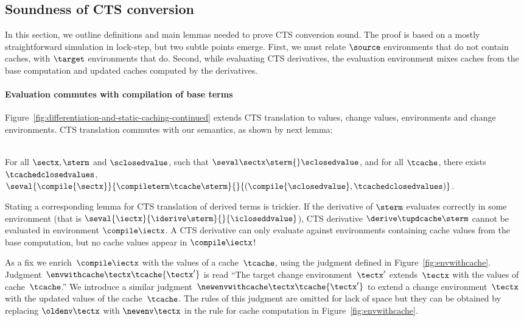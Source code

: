 \subsection{Soundness of CTS conversion}
\label{sec:transformation-soundness}

In this section, we outline definitions and main lemmas needed to prove CTS
conversion sound.
The proof is based on a
mostly straightforward simulation in lock-step, but two subtle points emerge.
First, we must relate $\source$ environments that do not contain caches, with
$\target$ environments that do.
Second, while evaluating CTS derivatives, the evaluation environment mixes
caches from the base computation and updated caches computed by the derivatives.

\paragraph{Evaluation commutes with compilation of base terms}



Figure~\ref{fig:differentiation-and-static-caching-continued}
extends CTS translation to values, change values, environments and
change environments. CTS translation commutes with our semantics, as shown by
next lemma:

\begin{lemma}
  \-\\
  For all $\sectx, \sterm$ and $\sclosedvalue$, such that
  $\seval\sectx\sterm{}\sclosedvalue$, and
  for all $\tcache$, there exists $\tcachedclosedvalues$,
  $\seval
  {\compile{\sectx}}{\compileterm\tcache\sterm}
  {}
  {(\compile{\sclosedvalue}, \tcachedclosedvalues)}$.
\end{lemma}

Stating a corresponding lemma for CTS translation of derived terms is trickier.
If the derivative of $\sterm$ evaluates correctly in some environment
(that is $\seval{\iectx}{\iderive\sterm}{}{\icloseddvalue}$), CTS derivative
$\derive\tupdcache\sterm$ cannot be evaluated in environment $\compile\iectx$.
A CTS derivative can only evaluate against environments containing cache values
from the base computation, but no cache values appear in $\compile\iectx$!

As a fix we enrich~$\compile\iectx$ with the values of a cache~$\tcache$, using
the judgment defined in Figure~\ref{fig:envwithcache}.
Judgment~$\envwithcache\tectx\tcache{\tectx'}$ is read ``The target
change environment~$\tectx'$ extends~$\tectx$ with the values of
cache~$\tcache$.'' We introduce a similar
judgment~$\newenvwithcache\tectx\tcache{\tectx'}$ to extend a change
environment~$\tectx$ with the updated values of the cache~$\tcache$.
The rules of this judgment are omitted for lack of space but they
can be obtained by replacing $\oldenv\tectx$ with $\newenv\tectx$
in the rule for cache computation in Figure~\ref{fig:envwithcache}.

